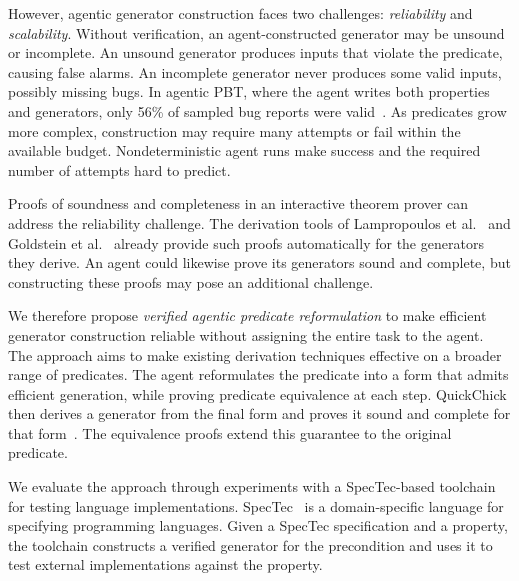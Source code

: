 However, agentic generator construction faces two challenges:
\emph{reliability} and \emph{scalability}.
Without verification, an agent-constructed generator may be unsound or
incomplete.
An unsound generator produces inputs that violate the predicate, causing false
alarms.
An incomplete generator never produces some valid inputs, possibly missing bugs.
In agentic PBT, where the agent writes both properties and generators, only
56\% of sampled bug reports were valid~\cite{maaz25agentic}.
As predicates grow more complex, construction may require many attempts or fail
within the available budget.
Nondeterministic agent runs make success and the required number of attempts
hard to predict.

Proofs of soundness and completeness in an interactive theorem prover can
address the reliability challenge.
The derivation tools of Lampropoulos et al.~\cite{lampropoulos18generators}
and Goldstein et al.~\cite{goldstein26palamedes} already provide such proofs
automatically for the generators they derive.
An agent could likewise prove its generators sound and complete, but constructing
these proofs may pose an additional challenge.

We therefore propose \emph{verified agentic predicate reformulation} to make
efficient generator construction reliable without assigning the entire task to the agent.
The approach aims to make existing derivation techniques effective on a broader
range of predicates.
The agent reformulates the predicate into a form that admits efficient
generation, while proving predicate equivalence at each step.
QuickChick then derives a generator from the final form
and proves it sound and complete for that
form~\cite{lampropoulos18generators,paraskevopoulou22computing}.
The equivalence proofs extend this guarantee to the original predicate.

We evaluate the approach through experiments with a SpecTec-based toolchain
for testing language implementations.
SpecTec~\cite{youn24spectec} is a domain-specific language for specifying
programming languages.
Given a SpecTec specification and a property, the toolchain constructs a verified
generator for the precondition and uses it to test external
implementations against the property.

